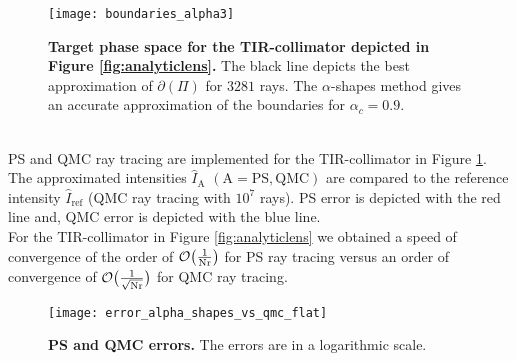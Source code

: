  \begin{figure}[h]
  \begin{center}
       \texttt{[image: boundaries\_alpha3]}
   \end{center}
        \caption{\textbf{Target phase space for the TIR-collimator depicted in
        Figure \ref{fig:analyticlens}.} The black line depicts the best approximation of $\partial$$(\Pi)$ for $3281$ rays. 
The $\alpha$-shapes method gives an accurate approximation of the boundaries for $\alpha_c = 0.9$.}
  \label{fig:Tir2}
\end{figure}
\\ \indent PS and QMC ray tracing are implemented for the TIR-collimator in Figure \ref{fig:Tir2}. The approximated intensities $\hat{I}_{\textrm{A}}$ $(\textrm{A} = \textrm{PS}, \textrm{QMC})$ are compared to the reference intensity $\hat{I}_{\textrm{ref}}$ (QMC ray tracing with $10^7$ rays).
PS error is depicted with the red line and, QMC error is depicted with the blue line. \\ \indent
For the TIR-collimator in Figure \ref{fig:analyticlens} we obtained a speed of convergence of the order of $\mathcal{O}\big(\frac{1}{\textrm{Nr}}\big)$ for PS ray tracing versus an order of convergence of $\mathcal{O}\big(\frac{1}{\sqrt{\textrm{Nr}}}\big)$ for QMC ray tracing.
\begin{figure}[t]
 \begin{center}
   \texttt{[image: error\_alpha\_shapes\_vs\_qmc\_flat]}
    \end{center}
     \caption{\textbf{PS and QMC errors.} The errors are in a logarithmic scale.}
 \label{fig:error2}
\end{figure}
